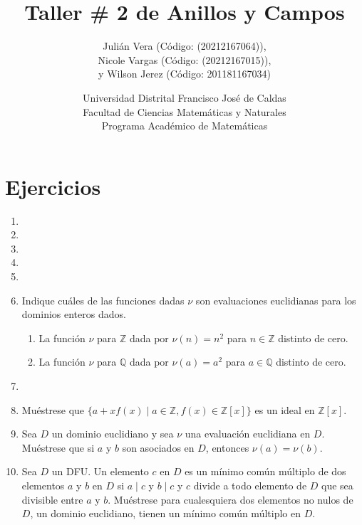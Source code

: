\documentclass[12pt]{article}
\title{Taller \# 2 de Anillos y Campos}
\author{
    Julián Vera (Código: (20212167064)), \\
    Nicole Vargas (Código: (20212167015)), \\
    y Wilson Jerez (Código: 201181167034)
}
\date{
    Universidad Distrital Francisco José de Caldas \\
    Facultad de Ciencias Matemáticas y Naturales \\
    Programa Académico de Matemáticas
}
\theoremstyle{definition}
\theoremstyle{remark}
\begin{document}
\maketitle

\section*{Ejercicios}

\begin{enumerate}
    \item 
    
    \item 
    
    \item 
    
    \item 
    
    \item 
    
    \item Indique cuáles de las funciones dadas $\nu$ son evaluaciones euclidianas para los dominios enteros dados.
    \begin{enumerate}
        \item La función $\nu$ para $\mathbb{Z}$ dada por $\nu(n) = n^2$ para $n \in \mathbb{Z}$ distinto de cero.
        \item La función $\nu$ para $\mathbb{Q}$ dada por $\nu(a) = a^2$ para $a \in \mathbb{Q}$ distinto de cero.
    \end{enumerate}
    
    \item 
    
    \item Muéstrese que $\{a+ xf(x) \mid a \in \mathbb{Z}, f(x) \in \mathbb{Z}[x]\}$ es un ideal en $\mathbb{Z}[x]$.
    
    \item Sea $D$ un dominio euclidiano y sea $\nu$ una evaluación euclidiana en $D$. Muéstrese que si $a$ y $b$ son asociados en $D$, entonces $\nu(a) = \nu(b)$.
    
    \item Sea $D$ un DFU. Un elemento $c$ en $D$ es un mínimo común múltiplo de dos elementos $a$ y $b$ en $D$ si $a \mid c$ y $b \mid c$ y $c$ divide a todo elemento de $D$ que sea divisible entre $a$ y $b$. Muéstrese para cualesquiera dos elementos no nulos de $D$, un dominio euclidiano, tienen un mínimo común múltiplo en $D$.
    

\end{enumerate}
\end{document}
